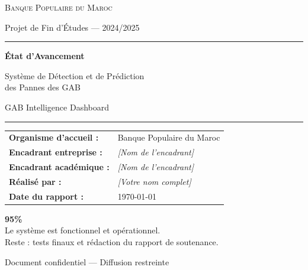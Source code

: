\documentclass[a4paper,12pt]{report}
\begin{document}
\begin{titlepage}
\centering
\vspace*{1cm}

{\Large\textsc{Banque Populaire du Maroc}}\par
\vspace{0.5cm}
{\large Projet de Fin d'Études — 2024/2025}\par

\vspace{2cm}
\rule{\textwidth}{2pt}\par
\vspace{0.8cm}
{\Huge\bfseries\textcolor{bpmred}{État d'Avancement}}\par
\vspace{0.5cm}
{\LARGE\textcolor{bpmblue}{Système de Détection et de Prédiction\\des Pannes des GAB}}\par
\vspace{0.3cm}
{\Large GAB Intelligence Dashboard}\par
\vspace{0.8cm}
\rule{\textwidth}{2pt}\par

\vspace{1.5cm}

\begin{tabular}{ll}
\textbf{Organisme d'accueil :} & Banque Populaire du Maroc \\
\textbf{Encadrant entreprise :} & \textit{[Nom de l'encadrant]} \\
\textbf{Encadrant académique :} & \textit{[Nom de l'encadrant]} \\
\textbf{Réalisé par :} & \textit{[Votre nom complet]} \\
\textbf{Date du rapport :} & \today \\
\end{tabular}

\vspace{2cm}

\begin{tcolorbox}[colback=done!10, colframe=done, title=\textbf{Avancement global}]
\centering
{\Huge\textcolor{done}{\textbf{95\%}}}\\[0.5em]
{\large Le système est fonctionnel et opérationnel.\\Reste : tests finaux et rédaction du rapport de soutenance.}
\end{tcolorbox}

\vfill
{\small Document confidentiel — Diffusion restreinte}
\end{titlepage}
\end{document}

